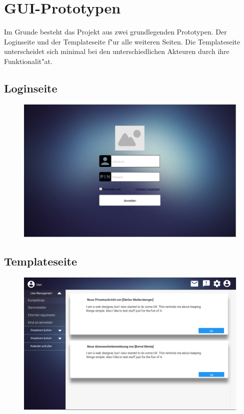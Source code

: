 \newpage
\section{GUI-Prototypen}
Im Grunde besteht das Projekt aus zwei grundlegenden Prototypen. Der Loginseite und der Templateseite f"ur alle weiteren Seiten. 
Die Templateseite unterscheidet sich minimal bei den unterschiedlichen Akteuren durch ihre Funktionalit"at.

\subsection{Loginseite}
 \begin{figure}[ht!]
  \includegraphics[width = 150mm]{pictures/Login.png}
 \end{figure}
 
 \newpage
 \subsection{Templateseite}
 \begin{figure}[ht!]
  \includegraphics[width = 150mm]{pictures/Template.png}
 \end{figure}
 
